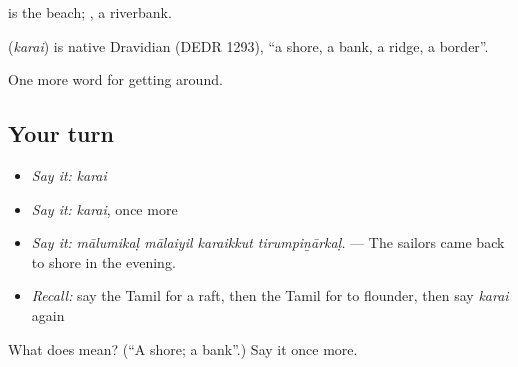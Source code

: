  is the beach; , a riverbank.

\begin{cousinweb}
\textbf{} (\emph{karai}) is native Dravidian (DEDR 1293), \textquotedblleft{}a shore, a bank, a ridge, a border\textquotedblright{}.
\end{cousinweb}

\begin{grammarlens}[title={What you've built}]
One more word for getting around.
\end{grammarlens}

\subsection*{Your turn}
\begin{itemize}
\raggedright
  \item \emph{Say it:} \emph{karai}
  \item \emph{Say it:} \emph{karai}, once more
  \item \emph{Say it:} \emph{mālumikaḷ mālaiyil karaikkut tirumpiṉārkaḷ.} — The sailors came back to shore in the evening.
  \item \emph{Recall:} say the Tamil for a raft, then the Tamil for to flounder, then say \emph{karai} again
\end{itemize}

\begin{tcolorbox}[breakable,colback=teal!4,colframe=teal!35!black,title={Before you move on}]
What does  mean? (\textquotedblleft{}A shore; a bank\textquotedblright{}.) Say it once more.
\end{tcolorbox}

